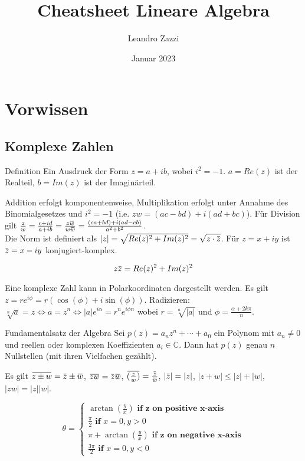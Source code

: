 \documentclass[a4paper,10pt]{article}
\title{Cheatsheet Lineare Algebra}
\author{Leandro Zazzi}
\date{Januar 2023}
\newcommand{\overbar}[1]{\mkern 1.5mu\overline{\mkern-1.5mu#1\mkern-1.5mu}\mkern 1.5mu}
\begin{document}
\section{Vorwissen}
\subsection{Komplexe Zahlen}
\begin{mainbox}{Definition}
Ein Ausdruck der Form $z = a + ib$, wobei $i^2 = -1$. $a = Re(z)$ ist der Realteil, $b = Im(z)$ ist der Imaginärteil.
\end{mainbox}

Addition erfolgt komponentenweise, Multiplikation erfolgt unter Annahme des Binomialgesetzes und $i^2 = -1$ (i.e. $z w = (a c - b d) + i (a d + b  c)$). Für Division gilt $\frac{z}{w} = \frac{c + id}{a + ib} = \frac{z\overbar{w}}{w\overbar{w}} = \frac{(ca + bd) + i(ad - cb)}{a^2 + b^2}$.\\
Die Norm ist definiert als $|z| = \sqrt{Re(z)^2 + Im(z)^2} = \sqrt{z \cdot \overbar{z}}$. Für $z = x + iy$ ist $\overbar{z} = x - iy$ konjugiert-komplex.

\begin{subbox}{}
$$z \overbar{z} = Re(z)^2 + Im(z)^2$$
\end{subbox}

Eine komplexe Zahl kann in Polarkoordinaten dargestellt werden. Es gilt $z = re^{i\phi} = r(\cos(\phi) + i\sin(\phi))$.
Radizieren: $\sqrt[n]{a} = z \iff a = z^n \iff |a| e^{i\alpha} = r^n e^{i\phi n}$ wobei $r = \sqrt[n]{|a|}$ und $\phi = \frac{\alpha + 2k\pi}{n}$.

\begin{mainbox}{Fundamentalsatz der Algebra}
  Sei $p(z) = a_n z^n + \cdots + a_0$ ein Polynom mit $a_n \neq 0$ und reellen oder komplexen Koeffizienten $a_i \in \mathbb{C}$. Dann hat $p(z)$ genau $n$ Nullstellen (mit ihren Vielfachen gezählt).
\end{mainbox}

Es gilt $\overbar{z \pm w} = \overbar{z} \pm \overbar{w}$, $\overbar{zw} = \overbar{z}\overbar{w}$, $\overbar{(\frac{z}{w})} = \frac{\overbar{z}}{\overbar{w}}$, $|\overbar{z}| = |z|$, $|z + w| \leq |z| + |w|$, $|zw| = |z| |w|$.

$$
\theta = \begin{cases}
  \arctan(\frac{y}{x}) \textbf{ if z on positive x-axis}\\
  \frac{\pi}{2} \textbf{ if }x=0, y > 0\\
  \pi + \arctan(\frac{y}{x}) \textbf{ if z on negative x-axis}\\
  \frac{3\pi}{2} \textbf{ if }x=0, y < 0
\end{cases}
$$
\end{document}
